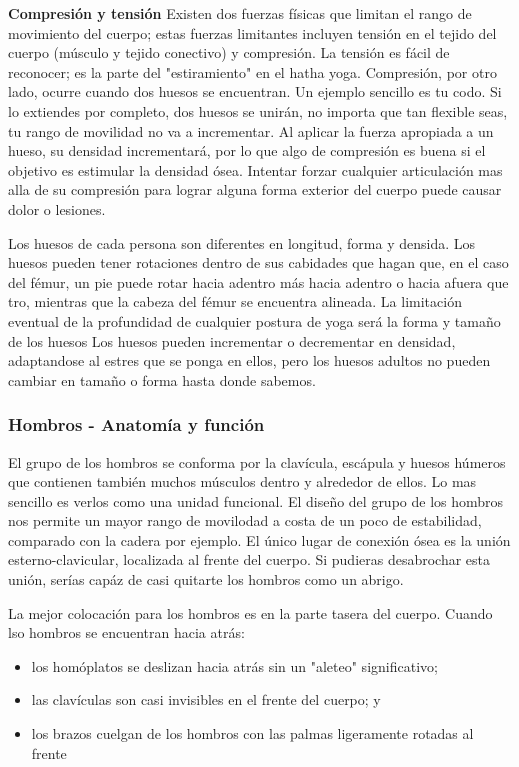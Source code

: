 \textbf{Compresión y tensión}
Existen dos fuerzas físicas que limitan el rango de movimiento del cuerpo; estas fuerzas limitantes incluyen tensión en el tejido del cuerpo (músculo y tejido conectivo) y compresión. La tensión es fácil de reconocer; es la parte del "estiramiento" en el hatha yoga. Compresión, por otro lado, ocurre cuando dos huesos se encuentran. Un ejemplo sencillo es tu codo. Si lo extiendes por completo, dos huesos se unirán, no importa que tan flexible seas, tu rango de movilidad no va a incrementar. Al aplicar la fuerza apropiada a un hueso, su densidad incrementará, por lo que algo de compresión es buena si el objetivo es estimular la densidad ósea. Intentar forzar cualquier articulación mas alla de su compresión para lograr alguna forma exterior del cuerpo puede causar dolor o lesiones.

Los huesos de cada persona son diferentes en longitud, forma y densida. Los huesos pueden tener rotaciones dentro de sus cabidades que hagan que, en el caso del fémur, un pie puede rotar hacia adentro más hacia adentro o hacia afuera que tro, mientras que la cabeza del fémur se encuentra alineada. La limitación eventual de la profundidad de cualquier postura de yoga será la forma y tamaño de los huesos Los huesos pueden incrementar o decrementar en densidad, adaptandose al estres que se ponga en ellos, pero los huesos adultos no pueden cambiar en tamaño o forma hasta donde sabemos.

\subsubsection{Hombros - Anatomía y función}
El grupo de los hombros se conforma por la clavícula, escápula y huesos húmeros que contienen también muchos músculos dentro y alrededor de ellos. Lo mas sencillo es verlos como una unidad funcional. El diseño del grupo de los hombros nos permite un mayor rango de movilodad a costa de un poco de estabilidad, comparado con la cadera por ejemplo. El único lugar de conexión ósea es la unión esterno-clavicular, localizada al frente del cuerpo. Si pudieras desabrochar esta unión, serías capáz de casi quitarte los hombros como un abrigo.

La mejor colocación para los hombros es en la parte tasera del cuerpo. Cuando lso hombros se encuentran hacia atrás:
\begin{itemize}
	\item los homóplatos se deslizan hacia atrás sin un "aleteo" significativo;
	\item las clavículas son casi invisibles en el frente del cuerpo; y
	\item los brazos cuelgan de los hombros con las palmas ligeramente rotadas al frente
\end{itemize}

